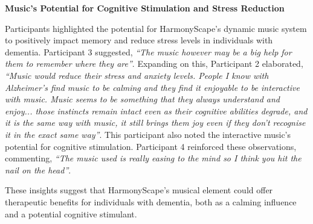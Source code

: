 \documentclass{l4proj}
\begin{document}
\textbf{Music's Potential for Cognitive Stimulation and Stress Reduction}

Participants highlighted the potential for HarmonyScape's dynamic music system to positively impact memory and reduce stress levels in individuals with dementia. Participant 3 suggested, \emph{“The music however may be a big help for them to remember where they are”}. Expanding on this, Participant 2 elaborated, \emph{“Music would reduce their stress and anxiety levels. People I know with Alzheimer's find music to be calming and they find it enjoyable to be interactive with music. Music seems to be something that they always understand and enjoy... those instincts remain intact even as their cognitive abilities degrade, and it is the same way with music, it still brings them joy even if they don't recognise it in the exact same way”}. This participant also noted the interactive music's potential for cognitive stimulation. Participant 4 reinforced these observations, commenting, \emph{“The music used is really easing to the mind so I think you hit the nail on the head”}. 

These insights suggest that HarmonyScape's musical element could offer therapeutic benefits for individuals with dementia, both as a calming influence and a potential cognitive stimulant.




\end{document}
